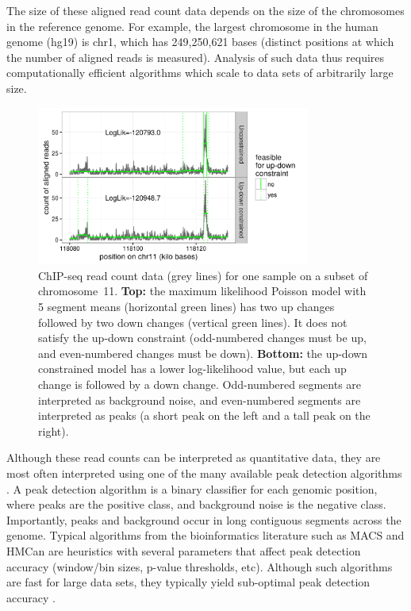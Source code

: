 \documentclass[twoside,11pt]{article}
\begin{document}
The size of these aligned read count data depends on the size of the
chromosomes in the reference genome. For example, the largest
chromosome in the human genome (hg19) is chr1, which has 249,250,621
bases (distinct positions at which the number of aligned reads is
measured). Analysis of such data thus requires computationally
efficient algorithms which scale to data sets of arbitrarily large
size.

\begin{figure}[t!]
  \centering
  \includegraphics[width=0.8\textwidth]{figure-data-models}
  \vskip -0.5cm
  \caption{ChIP-seq read count data (grey lines) for one sample on a
    subset of chromosome~11. \textbf{Top:} the maximum likelihood
    Poisson model with 5 segment means (horizontal green lines) has
    two up changes followed by two down changes (vertical green
    lines). It does not satisfy the up-down constraint (odd-numbered
    changes must be up, and even-numbered changes must be
    down). \textbf{Bottom:} the up-down constrained model has a lower
    log-likelihood value, but each up change is followed by a down
    change. Odd-numbered segments are interpreted as background noise,
    and even-numbered segments are interpreted as peaks (a short peak
    on the left and a tall peak on the right).}
  \label{fig:data-models}
\end{figure}

Although these read counts can be interpreted as quantitative data,
they are most often interpreted using one of the many available peak
detection algorithms \citep{evaluation2010, rye2010manually,
  chip-seq-bench}. A peak detection algorithm is a binary classifier
for each genomic position, where peaks are the positive class, and
background noise is the negative class. Importantly, peaks and
background occur in long contiguous segments across the
genome. Typical algorithms from the bioinformatics literature such as
MACS \citep{MACS} and HMCan \citep{HMCan} are heuristics with several
parameters that affect peak detection accuracy (window/bin sizes,
p-value thresholds, etc). Although such algorithms are fast for large
data sets, they typically yield sub-optimal peak detection accuracy
\citep{HOCKING2016-chipseq}.
\end{document}
